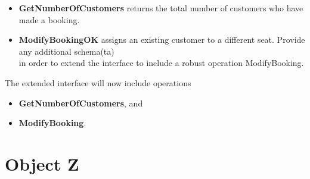\documentclass[12pt]{article}
\begin{document}
\begin{itemize}
	\item \textbf{GetNumberOfCustomers} returns the total number of customers who have made a booking.
	\item \textbf{ModifyBookingOK} assigns an existing customer to a different seat. Provide any additional schema(ta) \\
in order to extend the interface to include a robust operation ModifyBooking.
\end{itemize}

\noindent The extended interface will now include operations
\begin{itemize}
	\item \textbf{GetNumberOfCustomers}, and
	\item \textbf{ModifyBooking}.
\end{itemize}

\newpage

\section{Object Z}
\end{document}
